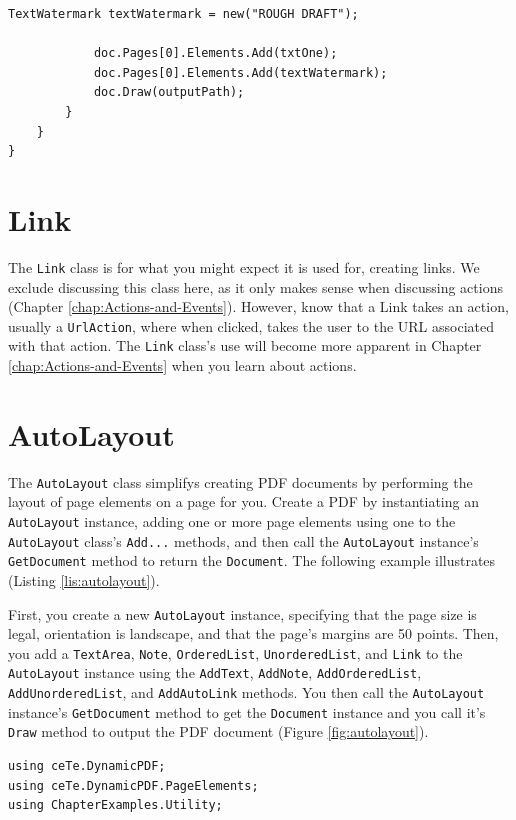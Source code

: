 \documentclass[american,letterpaper]{tufte-book}
\numberwithin{equation}{section}
\numberwithin{figure}{section}
\begin{document}
{{\begin{lstlisting}[caption={Adding a text watermark to a PDF document.},label={lis:watermark-Adding-a-text},basicstyle={\small\ttfamily},breaklines=true]
            TextWatermark textWatermark = new("ROUGH DRAFT");

            doc.Pages[0].Elements.Add(txtOne);
            doc.Pages[0].Elements.Add(textWatermark);
            doc.Draw(outputPath);
        }
    }
}
\end{lstlisting}
\leavevmode\egroup

\section{Link}

The \texttt{Link} class is for what you might expect
it is used for, creating links. We exclude discussing this class here,
as it only makes sense when discussing actions (Chapter \ref{chap:Actions-and-Events}).
However, know that a Link takes an action, usually a \texttt{UrlAction},
where when clicked, takes the user to the URL associated with that
action. The \texttt{Link} class's use will become more
apparent in Chapter \ref{chap:Actions-and-Events} when you learn
about actions.

\section{AutoLayout}
\label{sec:autolayout}
The \texttt{AutoLayout} class simplifys creating PDF documents by performing the layout of page elements on a page for you. Create a PDF by instantiating an \texttt{AutoLayout} instance, adding one or more page elements using one to the \texttt{AutoLayout} class's \texttt{Add...} methods, and then call the \texttt{AutoLayout} instance's \texttt{GetDocument} method to return the \texttt{Document}. The following example illustrates (Listing \ref{lis:autolayout}).

First, you create a new \texttt{AutoLayout} instance, specifying that the page size is legal, orientation is landscape, and that the page's margins are 50 points.  Then, you add a \texttt{TextArea}, \texttt{Note}, \texttt{OrderedList}, \texttt{UnorderedList}, and \texttt{Link} to the \texttt{AutoLayout} instance using the \texttt{AddText}, \texttt{AddNote}, \texttt{AddOrderedList}, \texttt{AddUnorderedList}, and \texttt{AddAutoLink} methods. You then call the \texttt{AutoLayout} instance's \texttt{GetDocument} method to get the \texttt{Document} instance and you call it's \texttt{Draw} method to output the PDF document (Figure \ref{fig:autolayout}). 

\bgroup{}
\begin{lstlisting}[caption={Using AutoLayout to create a PDF document.},label={lis:autolayout},basicstyle={\small\ttfamily},breaklines=true]
using ceTe.DynamicPDF;
using ceTe.DynamicPDF.PageElements;
using ChapterExamples.Utility;


\end{lstlisting}}}
\end{document}
